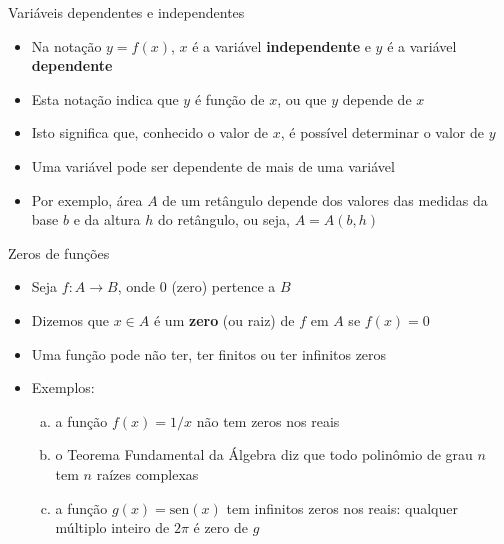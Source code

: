 \begin{frame}[fragile]{Variáveis dependentes e independentes}

    \begin{itemize}
        \item Na notação $y = f(x)$, $x$ é a variável \textbf{independente} e $y$ é a variável \textbf{dependente}

        \item Esta notação indica que $y$ é função de $x$, ou que $y$ depende de $x$

        \item Isto significa que, conhecido o valor de $x$, é possível determinar o valor de $y$

        \item Uma variável pode ser dependente de mais de uma variável

        \item Por exemplo, área $A$ de um retângulo depende dos valores das medidas da base $b$ e da altura $h$ do retângulo, ou seja, $A = A(b, h)$
    \end{itemize}

\end{frame}

\begin{frame}[fragile]{Zeros de funções}

    \begin{itemize}
        \item Seja $f: A \to B$, onde $0$ (zero) pertence a $B$

        \item Dizemos que $x\in A$ é um \textbf{zero} (ou raiz) de $f$ em $A$ se $f(x) = 0$

        \item Uma função pode não ter, ter finitos ou ter infinitos zeros

        \item Exemplos:
        \begin{enumerate}[(a)]
            \item a função $f(x) = 1/x$ não tem zeros nos reais
            \item o Teorema Fundamental da Álgebra diz que todo polinômio de grau $n$ tem $n$ raízes complexas
            \item a função $g(x) = \mathrm{sen}(x)$ tem infinitos zeros nos reais: qualquer múltiplo inteiro de $2\pi$ é zero de $g$
        \end{enumerate}
    \end{itemize}

\end{frame}

